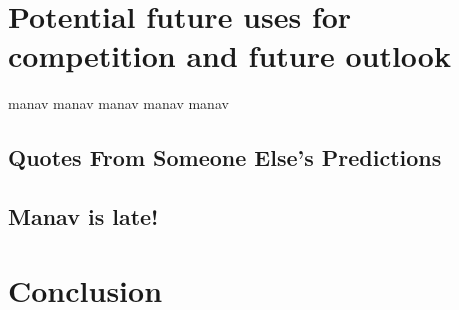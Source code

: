 \documentclass[
]{book}
\begin{document}
\hypertarget{potential-future-uses-for-competition-and-future-outlook}{%
\chapter{Potential future uses for competition and future outlook}\label{potential-future-uses-for-competition-and-future-outlook}}

manav manav manav manav manav

\hypertarget{quotes-from-someone-elses-predictions}{%
\section{Quotes From Someone Else's Predictions}\label{quotes-from-someone-elses-predictions}}

\hypertarget{manav-is-late}{%
\section{Manav is late!}\label{manav-is-late}}

\hypertarget{conclusion}{%
\chapter{Conclusion}\label{conclusion}}

  
\end{document}
